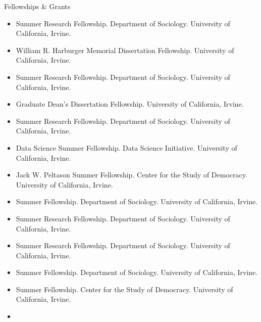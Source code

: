 \documentclass{resume} %
\newenvironment{hangt}[1]
 {\par\vspace{-\parsep}%
  \begin{itemize}[label={#1\ \quad},leftmargin=*,labelsep=0pt]
  \raggedright
  \item\relax
  \vspace*{8pt}
  }
 {\end{itemize}}
\newcommand{\datefill}{\quad \hspace{12pt}}
\begin{document}
\begin{rSection}{Fellowships \& Grants}
\begin{hangt}{2018 \datefill}
Summer Research Fellowship. Department of Sociology. University of California, Irvine. %
\end{hangt}
\begin{hangt}{2018 \datefill}
William R. Harburger Memorial Dissertation Fellowship. University of California, Irvine. %
\end{hangt}
\begin{hangt}{2017 \datefill}
Summer Research Fellowship. Department of Sociology. University of California, Irvine. %
\end{hangt}
\begin{hangt}{2017 \datefill}
Graduate Dean's Dissertation Fellowship. University of California, Irvine. %
\end{hangt}
\begin{hangt}{2016 \datefill}
Summer Research Fellowship. Department of Sociology. University of California, Irvine. %
\end{hangt}
\begin{hangt}{2016 \datefill}
Data Science Summer Fellowship. Data Science Initiative. University of California, Irvine. %
\end{hangt}
\begin{hangt}{2016 \datefill}
Jack W. Peltason Summer Fellowship. Center for the Study of Democracy. University of California, Irvine. %
\end{hangt}
\begin{hangt}{2015 \datefill}
Summer Fellowship. Department of Sociology. University of California, Irvine. %
\end{hangt}
\begin{hangt}{2015 \datefill}
Summer Research Fellowship. Department of Sociology. University of California, Irvine. %
\end{hangt}
\begin{hangt}{2014 \datefill}
Summer Research Fellowship. Department of Sociology. University of California, Irvine. %
\end{hangt}
\begin{hangt}{2014 \datefill}
Summer Fellowship. Department of Sociology. University of California, Irvine. %
\end{hangt}
\begin{hangt}{2014 \datefill}
Summer Fellowship. Center for the Study of Democracy. University of California, Irvine. %
\end{hangt}
\begin{hangt}{2013 \datefill}

\end{hangt}
\end{rSection}
\end{document}
